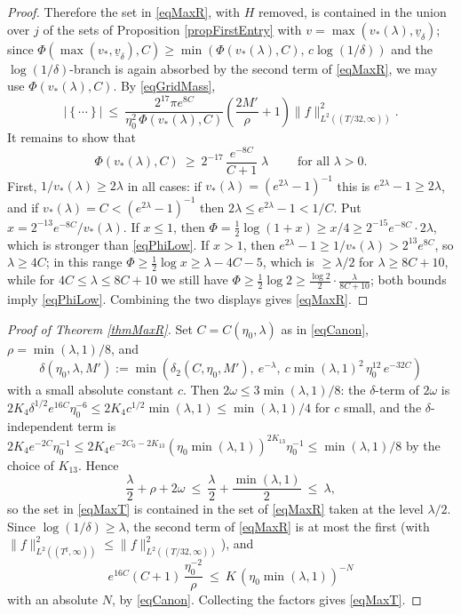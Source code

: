 \documentclass[11pt,twoside,reqno]{amsart}
\def\d{\delta}
\def\uv{\underline{v}_{\d}}
\theoremstyle{plain}
\numberwithin{equation}{section}
\begin{document}
\begin{proof}
Therefore the set in \eqref{eqMaxR}, with $H$ removed, is contained in the union over $j$ of the sets of Proposition \ref{propFirstEntry} with $v=\max(v_*(\lambda),\uv)$; since $\Phi(\max(v_*,\uv),C)\geq\min\left(\Phi(v_*(\lambda),C),\,c\log(1/\d)\right)$ and the $\log(1/\d)$-branch is again absorbed by the second term of \eqref{eqMaxR}, we may use $\Phi(v_*(\lambda),C)$. By \eqref{eqGridMass},
$$\left|\left\{\cdots\right\}\right|\ \leq\ \frac{2^{17}\pi e^{8C}}{\eta_0^2\,\Phi(v_*(\lambda),C)}\left(\frac{2M'}\rho+1\right)\|f\|^2_{L^2((T/32,\infty))}.$$
It remains to show that
\begin{equation}
\Phi(v_*(\lambda),C)\ \geq\ 2^{-17}\,\frac{e^{-8C}}{C+1}\;\lambda\qquad\text{ for all }\lambda>0.
\label{eqPhiLow}
\end{equation}
First, $1/v_*(\lambda)\geq2\lambda$ in all cases: if $v_*(\lambda)=(e^{2\lambda}-1)^{-1}$ this is $e^{2\lambda}-1\geq2\lambda$, and if $v_*(\lambda)=C<(e^{2\lambda}-1)^{-1}$ then $2\lambda\leq e^{2\lambda}-1<1/C$. Put $x=2^{-13}e^{-8C}/v_*(\lambda)$. If $x\leq1$, then $\Phi=\frac12\log(1+x)\geq x/4\geq2^{-15}e^{-8C}\cdot2\lambda$, which is stronger than \eqref{eqPhiLow}. If $x>1$, then $e^{2\lambda}-1\geq1/v_*(\lambda)>2^{13}e^{8C}$, so $\lambda\geq4C$; in this range $\Phi\geq\frac12\log x\geq\lambda-4C-5$, which is $\geq\lambda/2$ for $\lambda\geq8C+10$, while for $4C\leq\lambda\leq8C+10$ we still have $\Phi\geq\frac12\log2\geq\frac{\log2}2\cdot\frac\lambda{8C+10}$; both bounds imply \eqref{eqPhiLow}. Combining the two displays gives \eqref{eqMaxR}.
\end{proof}

\begin{proof}[Proof of Theorem \ref{thmMaxR}]
Set $C=C(\eta_0,\lambda)$ as in \eqref{eqCanon}, $\rho=\min(\lambda,1)/8$, and
$$\d(\eta_0,\lambda,M'):=\min\left(\d_2\left(C,\eta_0,M'\right),\ e^{-\lambda},\ c\min(\lambda,1)^2\,\eta_0^{12}\,e^{-32C}\right)$$
with a small absolute constant $c$. Then $2\omega\leq3\min(\lambda,1)/8$: the $\d$-term of $2\omega$ is $2K_4\d^{1/2}e^{16C}\eta_0^{-6}\leq2K_4c^{1/2}\min(\lambda,1)\leq\min(\lambda,1)/4$ for $c$ small, and the $\d$-independent term is $2K_4e^{-2C}\eta_0^{-1}\leq2K_4e^{-2C_0-2K_{13}}\left(\eta_0\min(\lambda,1)\right)^{2K_{13}}\eta_0^{-1}\leq\min(\lambda,1)/8$ by the choice of $K_{13}$. Hence
$$\frac\lambda2+\rho+2\omega\ \leq\ \frac\lambda2+\frac{\min(\lambda,1)}2\ \leq\ \lambda,$$
so the set in \eqref{eqMaxT} is contained in the set of \eqref{eqMaxR} taken at the level $\lambda/2$. Since $\log(1/\d)\geq\lambda$, the second term of \eqref{eqMaxR} is at most the first (with $\|f\|^2_{L^2((T^\sharp,\infty))}\leq\|f\|^2_{L^2((T/32,\infty))}$), and
$$e^{16C}\left(C+1\right)\,\frac{\eta_0^{-2}}{\rho}\ \leq\ K\,\left(\eta_0\min(\lambda,1)\right)^{-N}$$
with an absolute $N$, by \eqref{eqCanon}. Collecting the factors gives \eqref{eqMaxT}.
\end{proof}
\end{document}
